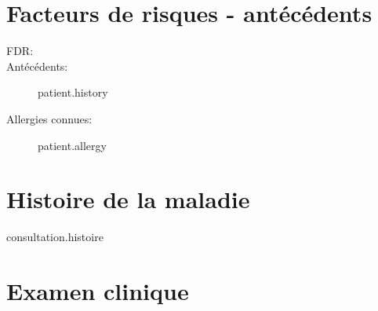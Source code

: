 \documentclass[12pt,a4paper]{article}
\begin{document}
         \section{Facteurs de risques - antécédents }
      \begin{description}
        
      \item[FDR:]
        
        \begin{itemize}
          {%
            {%
              {%
                {%
                  {%
                    {%
                      
                    \end{itemize}

                  \item[Antécédents:]
                    {{ patient.history }}
                  \item[Allergies connues:] {{ patient.allergy }}
                  \end{description}
                  \section{Histoire de la maladie}
                  {{ consultation.histoire }}
                  


                  \section{Examen clinique}
\end{document}

